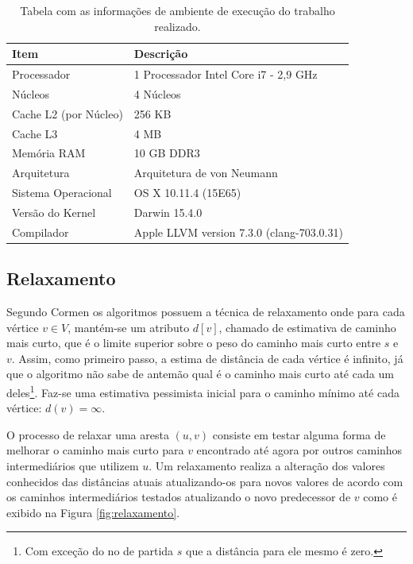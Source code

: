 \documentclass[12pt]{article}
\begin{document}
\begin{table}[H]
	\caption{Tabela com as informações de ambiente de execução do trabalho realizado.}
	\centering
    \begin{tabular}{l|l}
    \hline
    \textbf{Item}                & \textbf{Descrição} \\ \hline \hline
    Processador         & 1 Processador Intel Core i7 - 2,9 GHz         \\
    Núcleos             & 4 Núcleos \\
    Cache L2 (por Núcleo) & 256 KB \\
    Cache L3            & 4 MB \\
    Memória RAM         & 10 GB DDR3        \\
    Arquitetura         & Arquitetura de von Neumann         \\
    Sistema Operacional & OS X 10.11.4 (15E65)         \\
    Versão do Kernel    & Darwin 15.4.0 \\
    Compilador          & Apple LLVM version 7.3.0 (clang-703.0.31)         \\\hline
    \end{tabular}
\end{table}

\subsection{Relaxamento}

Segundo Cormen \cite{cormen2002algoritmos} os algoritmos possuem a técnica de relaxamento onde para cada vértice $v \in V$, mantém-se um atributo $d[v]$, chamado de estimativa de caminho mais curto, que é o limite superior sobre o peso do caminho mais curto entre $s$ e $v$. Assim, como primeiro passo, a estima de distância de cada vértice é infinito, já que o algoritmo não sabe de antemão qual é o caminho mais curto até cada um deles\footnote{Com exceção do no de partida $s$ que a distância para ele mesmo é zero.}. 
Faz-se uma estimativa pessimista inicial para o caminho mínimo até cada vértice: $d(v)=\infty$.

O processo de relaxar uma aresta $(u,v)$ consiste em testar alguma forma de melhorar o caminho mais curto para $v$ encontrado até agora por outros caminhos intermediários que utilizem $u$. Um relaxamento realiza a alteração dos valores conhecidos das distâncias atuais atualizando-os para novos valores de acordo com os caminhos intermediários testados atualizando o novo predecessor de $v$ como é exibido na Figura \ref{fig:relaxamento}.
\end{document}
